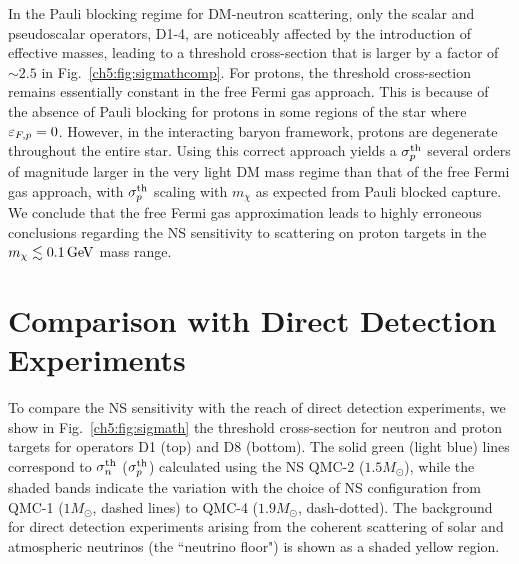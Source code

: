 In the Pauli blocking regime for DM-neutron scattering, only the scalar and pseudoscalar operators, D1-4,  are noticeably affected by the introduction of effective masses, leading to a threshold cross-section that is larger by a factor of $\sim2.5$ in Fig.~\ref{ch5:fig:sigmathcomp}. For protons, the threshold cross-section remains essentially constant in the free Fermi gas approach. This is because of the absence of Pauli blocking for protons in some regions of the star where $\varepsilon_{F,p}=0$. However, in the interacting baryon framework, protons are degenerate throughout the entire star. Using this correct approach yields a $\sigma^\mathrm{th}_p$ several orders of magnitude larger in the very light DM mass regime than that of the free Fermi gas approach, with $\sigma^\mathrm{th}_p$ scaling with $m_\chi$ as expected from Pauli blocked capture. 
We conclude that the free Fermi gas approximation leads to highly erroneous conclusions regarding the NS sensitivity to scattering on proton targets in the $m_\chi\lesssim0.1{\rm \,GeV}$ mass range. 

\section{Comparison with Direct Detection Experiments}
\label{ch5:sec:DD_comparison}


To compare the NS sensitivity with the reach of direct detection experiments, we show in Fig.~\ref{ch5:fig:sigmath} the threshold cross-section for neutron and proton targets for operators  D1 (top) and D8 (bottom). The solid green (light blue) lines correspond to $\sigma^\mathrm{th}_n$ ($\sigma^\mathrm{th}_p$) calculated using the NS QMC-2 ($1.5 M_\odot$),  while the shaded bands indicate the variation with the choice of NS configuration from  QMC-1 ($1M_\odot$, dashed lines) to QMC-4 ($1.9 M_\odot$, dash-dotted). The background for direct detection experiments arising from the coherent scattering of solar and atmospheric neutrinos (the ``neutrino floor") is shown as a shaded yellow region. 

